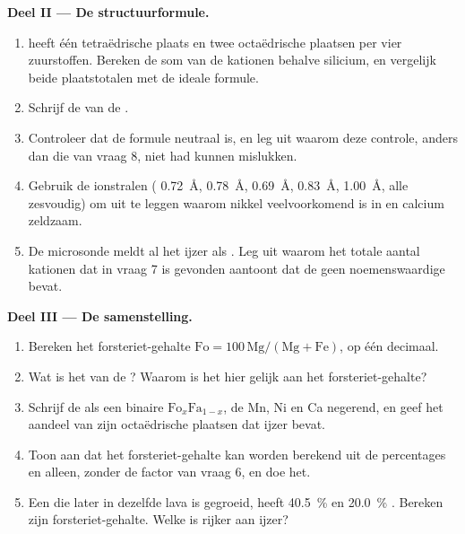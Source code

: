 \begin{problem}
\medskip
\noindent\textbf{Deel II --- De structuurformule.}
\begin{enumerate}[resume]
  \item {} heeft één tetraëdrische plaats en twee octaëdrische plaatsen per vier zuurstoffen. Bereken de som van de kationen
        behalve silicium, en vergelijk beide plaatstotalen met de ideale formule.
  \item Schrijf de  van de .
  \item Controleer dat de formule neutraal is, en leg uit waarom deze controle, anders dan die van vraag 8, niet had kunnen mislukken.
  \item Gebruik de ionstralen ( \qty{0.72}{\angstrom},  \qty{0.78}{\angstrom},  \qty{0.69}{\angstrom},
         \qty{0.83}{\angstrom},  \qty{1.00}{\angstrom}, alle zesvoudig) om uit te leggen waarom nikkel veelvoorkomend
        is in  en calcium zeldzaam.
  \item De microsonde meldt al het ijzer als . Leg uit waarom het totale aantal kationen dat in vraag 7 is gevonden aantoont dat
        de  geen noemenswaardige  bevat.
\end{enumerate}

\medskip
\noindent\textbf{Deel III --- De samenstelling.}
\begin{enumerate}[resume]
  \item Bereken het forsteriet-gehalte $\mathrm{Fo} = 100\,\mathrm{Mg}/(\mathrm{Mg} +
        \mathrm{Fe})$, op één decimaal.
  \item Wat is het  van de ? Waarom is het hier gelijk aan het forsteriet-gehalte?
  \item Schrijf de  als een binaire  $\mathrm{Fo}_x\mathrm{Fa}_{1-x}$, de Mn, Ni en Ca negerend, en geef het aandeel van zijn
        octaëdrische plaatsen dat ijzer bevat.
  \item Toon aan dat het forsteriet-gehalte kan worden berekend uit de percentages  en  alleen, zonder de factor van vraag 6,
        en doe het.
  \item Een  die later in dezelfde lava is gegroeid, heeft \qty{40.5}{\percent}  en \qty{20.0}{\percent} . Bereken zijn
        forsteriet-gehalte. Welke  is rijker aan ijzer?
\end{enumerate}


\end{problem}
